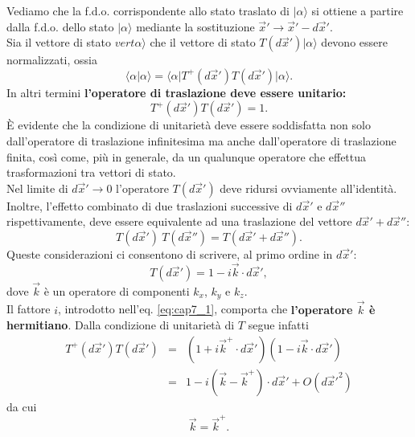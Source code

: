 \documentclass[a4paper,12pt,oneside]{book}
\begin{document}
Vediamo che la f.d.o. corrispondente allo stato traslato di $\vert \alpha \rangle $ si ottiene a partire dalla f.d.o. dello stato $\vert \alpha \rangle $ mediante la sostituzione $\vec{x}' \rightarrow \vec{x}'-d\vec{x}'$.\\
Sia il vettore di stato $vert \alpha \rangle$ che il vettore di stato $T(d\vec{x}') \vert \alpha \rangle$ devono essere normalizzati, ossia
\begin{equation}
\langle \alpha \vert \alpha \rangle = \langle \alpha \vert T^+(d\vec{x}') T(d\vec{x}') \vert \alpha \rangle .
\end{equation}
In altri termini \textbf{l'operatore di traslazione deve essere unitario:}
\begin{equation}
T^+(d\vec{x}') T(d\vec{x}') =1 .
\end{equation}
È evidente che la condizione di unitarietà deve essere soddisfatta non solo dall'operatore di traslazione infinitesima ma anche dall'operatore di traslazione finita, così come, più in generale, da un qualunque operatore che effettua trasformazioni tra vettori di stato.\\
Nel limite di $d\vec{x}' \rightarrow 0$ l'operatore $T(d\vec{x}')$ deve ridursi ovviamente all'identità. Inoltre, l'effetto combinato di due traslazioni successive di $d\vec{x}'$ e $d\vec{x}''$ rispettivamente, deve essere equivalente ad una traslazione del vettore $d\vec{x}'+d\vec{x}''$: 
\begin{equation}
T(d\vec{x}')\ T(d\vec{x}'') = T(d\vec{x}'+d\vec{x}'').
\end{equation}
Queste considerazioni ci consentono di scrivere, al primo ordine in $d\vec{x}'$:
\begin{equation}
\label{eq:cap7_1}
T(d\vec{x}')=1-i\vec{k}\cdot d\vec{x}' ,
\end{equation}
dove $\vec{k}$ è un operatore di componenti $k_x$, $k_y$ e $k_z$.\\
Il fattore $i$, introdotto nell'eq. \eqref{eq:cap7_1}, comporta che \textbf{l'operatore ${\vec{k}}$ è hermitiano}. Dalla condizione di unitarietà di $T$ segue infatti
\begin{eqnarray}
T^+(d\vec{x}') T(d\vec{x}') & = & \left(1+i\vec{k}^+\cdot d\vec{x}'\right) \left(1-i\vec{k}\cdot d\vec{x}'\right) \nonumber \\ 
& = & 1-i\left(\vec{k}-\vec{k}^+\right)\cdot d\vec{x}'+O({d\vec{x}' }^2) 
\end{eqnarray}
da cui
\begin{equation}
\vec{k}=\vec{k}^+ .
\end{equation}
\end{document}
